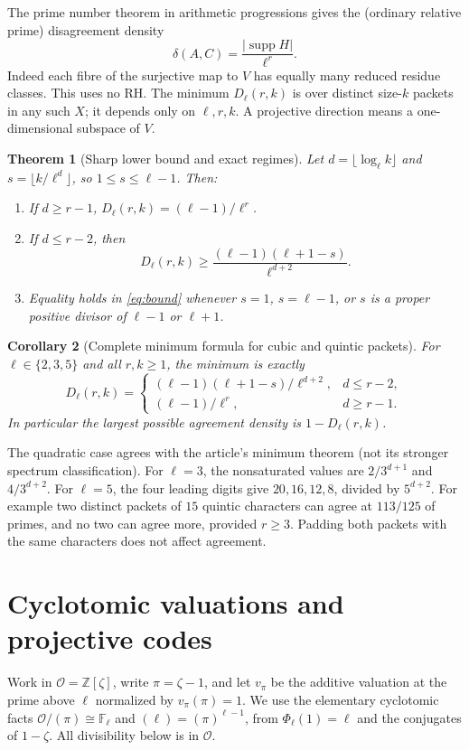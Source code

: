\documentclass[11pt]{article}
\newtheorem{theorem}{Theorem}[section]
\newtheorem{corollary}[theorem]{Corollary}
\theoremstyle{remark}\newtheorem{remark}[theorem]{Remark}
\newcommand{\F}{\mathbb F}
\newcommand{\Z}{\mathbb Z}
\newcommand{\supp}{\operatorname{supp}}
\begin{document}
The prime number theorem in arithmetic progressions gives the (ordinary relative prime) disagreement density
\begin{equation}\label{eq:density}
 \delta(A,C)=\frac{|\supp H|}{\ell^r}.
\end{equation}
Indeed each fibre of the surjective map to $V$ has equally many reduced residue classes. This uses no RH. The minimum $D_\ell(r,k)$ is over distinct size-$k$ packets in any such $X$; it depends only on $\ell,r,k$. A projective direction means a one-dimensional subspace of $V$.

\begin{theorem}[Sharp lower bound and exact regimes]\label{thm:main}
Let $d=\lfloor\log_\ell k\rfloor$ and $s=\lfloor k/\ell^d\rfloor$, so $1\le s\le\ell-1$. Then:
\begin{enumerate}
\item If $d\ge r-1$, $D_\ell(r,k)=(\ell-1)/\ell^r$.
\item If $d\le r-2$, then
\begin{equation}\label{eq:bound}
 D_\ell(r,k)\ge \frac{(\ell-1)(\ell+1-s)}{\ell^{d+2}}.
\end{equation}
\item Equality holds in \eqref{eq:bound} whenever $s=1$, $s=\ell-1$, or $s$ is a proper positive divisor of $\ell-1$ or $\ell+1$.
\end{enumerate}
\end{theorem}

\begin{corollary}[Complete minimum formula for cubic and quintic packets]\label{cor:complete}
For $\ell\in\{2,3,5\}$ and all $r,k\ge1$, the minimum is exactly
\[
 D_\ell(r,k)=\begin{cases}
 (\ell-1)(\ell+1-s)/\ell^{d+2}, & d\le r-2,\\
 (\ell-1)/\ell^r, & d\ge r-1.
 \end{cases}
\]
In particular the largest possible agreement density is $1-D_\ell(r,k)$.
\end{corollary}
The quadratic case agrees with the article's minimum theorem (not its stronger spectrum classification). For $\ell=3$, the nonsaturated values are $2/3^{d+1}$ and $4/3^{d+2}$. For $\ell=5$, the four leading digits give $20,16,12,8$, divided by $5^{d+2}$. For example two distinct packets of $15$ quintic characters can agree at $113/125$ of primes, and no two can agree more, provided $r\ge3$. Padding both packets with the same characters does not affect agreement.

\section{Cyclotomic valuations and projective codes}
Work in $\mathcal O=\Z[\zeta]$, write $\pi=\zeta-1$, and let $v_\pi$ be the additive valuation at the prime above $\ell$ normalized by $v_\pi(\pi)=1$. We use the elementary cyclotomic facts $\mathcal O/(\pi)\cong\F_\ell$ and $(\ell)=(\pi)^{\ell-1}$, from $\Phi_\ell(1)=\ell$ and the conjugates of $1-\zeta$. All divisibility below is in $\mathcal O$.
\end{document}
